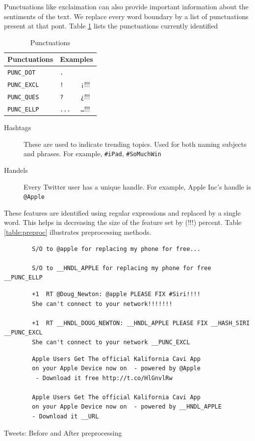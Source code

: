 Punctuations like exclaimation can also provide important information about the sentiments of the text.
We replace every word boundary by a list of punctuations present at that pont.
Table \ref{table:punc} lists the punctuations currently identified

\begin{table}[h]
\centering
	\begin{tabular}{|l|ll|}
	
	\hline
		\multicolumn{1}{|c|}{Punctuations} &
		\multicolumn{2}{|c|}{Examples} \\
	\hline
	\verb+PUNC_DOT+ & \verb+.+ & \verb++ \\
	\verb+PUNC_EXCL+ & \verb+!+ & \verb+¡+!!! \\
	\verb+PUNC_QUES+ & \verb+?+ & \verb+¿+!!! \\
	\verb+PUNC_ELLP+ & \verb+...+ & \verb+…+!!! \\
	\hline

	\end{tabular}
\caption{Punctuations}
\label{table:punc}
\end{table}

	\begin{description}
	\item[Hashtags]{These are used to indicate trending topics. Used for both naming subjects and phrases. For example, \verb+#iPad+, \verb+#SoMuchWin+}
	\item[Handels]{Every Twitter user has a unique handle. For example, Apple Inc's handle is \verb+@Apple+}
	\end{description}
	
These features are identified using regular expressions and replaced by a single word.
This helps in decreasing the size of the feature set by (!!!) percent.
Table \ref{table:preproc} illustrates preprocessing methods.

\begin{table}[h]
\centering
		\begin{verbatim}
		S/O to @apple for replacing my phone for free...

		S/O to __HNDL_APPLE for replacing my phone for free __PUNC_ELLP
		\end{verbatim}
		\begin{verbatim}
		+1  RT @Doug_Newton: @apple PLEASE FIX #Siri!!!! 
		She can't connect to your network!!!!!!!

		+1  RT __HNDL_DOUG_NEWTON: __HNDL_APPLE PLEASE FIX __HASH_SIRI __PUNC_EXCL
		She can't connect to your network __PUNC_EXCL 
		\end{verbatim}
		\begin{verbatim}
		Apple Users Get The official Kalifornia Cavi App 
		on your Apple Device now on  - powered by @Apple
		 - Download it free http://t.co/HlGnvlRw

		Apple Users Get The official Kalifornia Cavi App 
		on your Apple Device now on  - powered by __HNDL_APPLE 
		- Download it __URL
		\end{verbatim}
\caption{Tweets: Before and After preprocessing}
\label{table:preproc}
\end{table}

